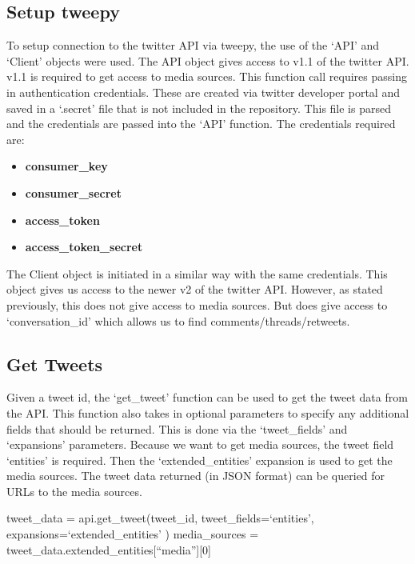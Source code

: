 \subsection{Setup tweepy}
To setup connection to the twitter API via tweepy, the use of the `API' and `Client' objects were used. The API object gives access to v1.1 of the twitter API. v1.1 is 
required to get access to media sources. This function call requires passing in authentication credentials. These are created via twitter developer portal
and saved in a `.secret' file that is not included in the repository. This file is parsed and the credentials are passed into the `API' function. The
credentials required are:
\begin{itemize}
    \item \textbf{consumer\_key}
    \item \textbf{consumer\_secret}
    \item \textbf{access\_token}
    \item \textbf{access\_token\_secret}
\end{itemize}

The Client object is initiated in a similar way with the same credentials. This object gives us access to the newer v2 of the twitter API. However, as stated previously,
this does not give access to media sources. But does give access to `conversation\_id' which allows us to find comments/threads/retweets.
\subsection{Get Tweets}
Given a tweet id, the `get\_tweet' function can be used to get the tweet data from the API. This function also takes in optional parameters to specify any
additional fields that should be returned. This is done via the `tweet\_fields' and `expansions' parameters. Because we want to get media sources, the
tweet field `entities' is required. Then the `extended\_entities' expansion is used to get the media sources. The tweet data returned (in JSON format)
can be queried for URLs to the media sources.
\begin{algorithmic}
    \begin{algorithmic}
        \STATE tweet\_data = api.get\_tweet(tweet\_id, 
        \bindent
        \STATE tweet\_fields=`entities',
        \STATE expansions=`extended\_entities'
        \eindent
        \STATE )
        \STATE media\_sources = tweet\_data.extended\_entities[``media''][0]
    \end{algorithmic}
\end{algorithmic}

